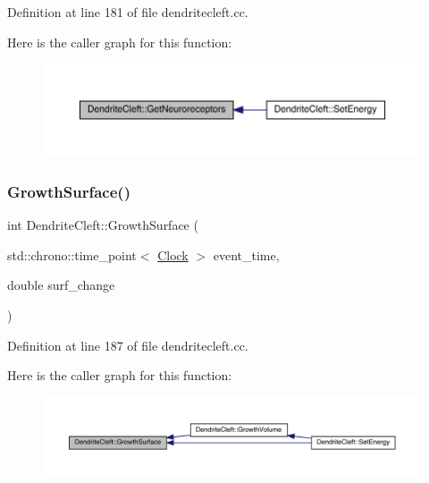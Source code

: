 Definition at line 181 of file dendritecleft.\+cc.

Here is the caller graph for this function\+:\nopagebreak
\begin{figure}[H]
\begin{center}
\leavevmode
\includegraphics[width=350pt]{class_dendrite_cleft_a4a14361574777fb1d66fd4ed2d4f2492_icgraph}
\end{center}
\end{figure}
\mbox{\label{class_dendrite_cleft_af4715ffbf1bf437523d07e37b7abc3e0}} 
\subsubsection{\texorpdfstring{Growth\+Surface()}{GrowthSurface()}}
{\footnotesize\ttfamily int Dendrite\+Cleft\+::\+Growth\+Surface (\begin{DoxyParamCaption}\item[{std\+::chrono\+::time\+\_\+point$<$ \hyperlink{universe_8h_a0ef8d951d1ca5ab3cfaf7ab4c7a6fd80}{Clock} $>$}]{event\+\_\+time,  }\item[{double}]{surf\+\_\+change }\end{DoxyParamCaption})}



Definition at line 187 of file dendritecleft.\+cc.

Here is the caller graph for this function\+:
\nopagebreak
\begin{figure}[H]
\begin{center}
\leavevmode
\includegraphics[width=350pt]{class_dendrite_cleft_af4715ffbf1bf437523d07e37b7abc3e0_icgraph}
\end{center}
\end{figure}
\mbox{\label{class_dendrite_cleft_a0cb2fc6ad72bba55b5f65130006d4b12}} 
